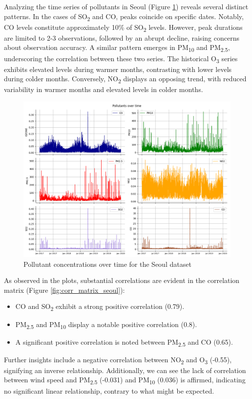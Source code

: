 Analyzing the time series of pollutants in Seoul (Figure \ref{fig:ts_seoul}) reveals several distinct patterns. In the cases of SO\textsubscript{2} and CO, peaks coincide on specific dates. Notably, CO levels constitute approximately 10\% of SO\textsubscript{2} levels. However, peak durations are limited to 2-3 observations, followed by an abrupt decline, raising concerns about observation accuracy. 
A similar pattern emerges in PM\textsubscript{10} and PM\textsubscript{2.5}, underscoring the correlation between these two series. The historical O\textsubscript{3} series exhibits elevated levels during warmer months, contrasting with lower levels during colder months.
Conversely, NO\textsubscript{2} displays an opposing trend, with reduced variability in warmer months and elevated levels in colder months. 

\begin{figure}[h]
    \centering
    \includegraphics[width=1\linewidth]{images/ts_seoul.png}
    \caption{Pollutant concentrations over time for the Seoul dataset}
    \label{fig:ts_seoul}
\end{figure}


As observed in the plots, substantial correlations are evident in the correlation matrix (Figure \ref{fig:corr_matrix_seoul}):

\begin{itemize}[noitemsep]
    \item CO and SO\textsubscript{2} exhibit a strong positive correlation (0.79).
    \item PM\textsubscript{2.5} and PM\textsubscript{10} display a notable positive correlation (0.8).
    \item A significant positive correlation is noted between PM\textsubscript{2.5} and CO (0.65).
\end{itemize}
Further insights include a negative correlation between NO\textsubscript{2} and O\textsubscript{3} (-0.55), signifying an inverse relationship. Additionally, we can see the lack of correlation between wind speed and PM\textsubscript{2.5} (-0.031) and PM\textsubscript{10} (0.036) is affirmed, indicating no significant linear relationship, contrary to what might be expected.

